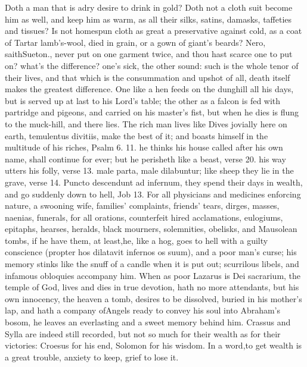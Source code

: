 {Doth a man that is adry desire to drink in gold? Doth not a cloth suit
become him as well, and keep him as warm, as all their silks, satins,
damasks, taffeties and tissues? Is not homespun cloth as great a
preservative against cold, as a coat of Tartar lamb's-wool, died in
grain, or a gown of giant's beards? Nero, saithSueton., never put
on one garment twice, and thou hast scarce one to put on? what's the
difference? one's sick, the other sound: such is the whole tenor of
their lives, and that which is the consummation and upshot of all,
death itself makes the greatest difference. One like a hen feeds on the
dunghill all his days, but is served up at last to his Lord's table;
the other as a falcon is fed with partridge and pigeons, and carried on
his master's fist, but when he dies is flung to the muck-hill, and
there lies. The rich man lives like Dives jovially here on earth,
temulentus divitiis, make the best of it; and boasts himself in the
multitude of his riches, Psalm  6. 11. he thinks his house called
after his own name, shall continue for ever; but he perisheth like a
beast, verse 20. his way utters his folly, verse 13. male parta, male
dilabuntur; like sheep they lie in the grave, verse 14. Puncto
descendunt ad infernum, they spend their days in wealth, and go
suddenly down to hell, Job  13. For all physicians and medicines
enforcing nature, a swooning wife, families' complaints, friends'
tears, dirges, masses, naenias, funerals, for all orations, counterfeit
hired acclamations, eulogiums, epitaphs, hearses, heralds, black
mourners, solemnities, obelisks, and Mausolean tombs, if he have them,
at least,he, like a hog, goes to hell with a guilty conscience
(propter hos dilatavit infernos os suum), and a poor man's curse; his
memory stinks like the snuff of a candle when it is put out; scurrilous
libels, and infamous obloquies accompany him. When as poor Lazarus is
Dei sacrarium, the temple of God, lives and dies in true devotion, hath
no more attendants, but his own innocency, the heaven a tomb, desires
to be dissolved, buried in his mother's lap, and hath a company
ofAngels ready to convey his soul into Abraham's bosom, he leaves
an everlasting and a sweet memory behind him. Crassus and Sylla are
indeed still recorded, but not so much for their wealth as for their
victories: Croesus for his end, Solomon for his wisdom. In a
word,to get wealth is a great trouble, anxiety to keep, grief to
lose it.
%
\begin{latin}

\end{latin}}
